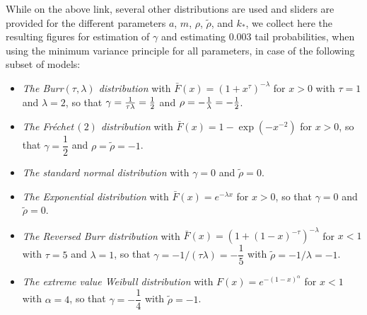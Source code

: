  
\noindent 
 
 
While on the above link, several other distributions are used and sliders are provided for the different parameters $a$, $m$, $\rho$, $\tilde\rho$, and $k_*$, we collect here the resulting figures for estimation of $\gamma$ and estimating 0.003 tail probabilities, when using the minimum variance principle for all parameters, in case of the following subset of models: 
\begin{itemize}
\item
{\it The Burr$\left(\tau,\lambda\right)$ distribution} with $\bar{F}(x)= \left(1+x^{\tau} \right)^{-\lambda}$ for $x>0$ with $\tau=1$ and $\lambda=2$, so that $\gamma= {1 \over \tau\lambda}={1 \over 2}$ and $\rho= -{1 \over \lambda}= -{1 \over 2}$. 
\item
{\it The Fr\'echet$\,(2)$ distribution} with $\bar{F}(x)= 1-\exp \left(-x^{-2} \right)$ for $x>0$, so that $\gamma = \dfrac{1}{2}$ and $\rho= \tilde\rho=-1$.
\item 
{\it The standard normal distribution} with $\gamma=0$ and $\tilde{\rho}=0$.
\item 	{\it The Exponential distribution} with $\bar{F}(x) = e^{-\lambda x}$ for $x>0$, so that $\gamma=0$ and $\tilde{\rho}=0$.
\item
{\it The Reversed Burr distribution} with 
$\bar{F}(x) =\left(1+(1-x)^{-\tau}\right)^{-\lambda}$
for $x< 1$ with $\tau=5$ and $\lambda=1$, so that $\gamma = -1/(\tau\lambda)=-\dfrac{1}{5}$ with $\tilde{\rho}=-1/\lambda=-1$.
 \item
{\it The extreme value Weibull distribution} with 
$F(x) =e^{-(1-x)^{\alpha}}$
for $x< 1$ with $\alpha =4$, so that $\gamma = -\dfrac{1}{4}$ with $\tilde{\rho}=-1$.
\end{itemize}


